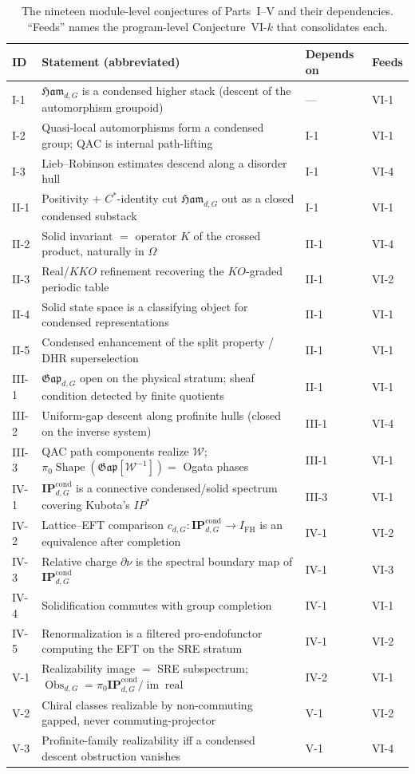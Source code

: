 \documentclass[12pt]{article}
\newcommand{\Shape}{\operatorname{Shape}}      %
\newcommand{\Ham}{\mathfrak{Ham}}              %
\newcommand{\Gap}{\mathfrak{Gap}}              %
\newcommand{\Weq}{\mathcal{W}}                 %
\newcommand{\IPcond}{\mathbf{IP}^{\mathrm{cond}}}  %
\newcommand{\rc}{\partial\nu}                   %
\newcommand{\dis}{\Omega}                       %
\newcommand{\IFH}{I_{\mathrm{FH}}}             %
\newcommand{\real}{\operatorname{real}}        %
\newcommand{\Obs}{\operatorname{Obs}}
\newcommand{\im}{\operatorname{im}}
\theoremstyle{plain}
\theoremstyle{definition}
\theoremstyle{remark}
\begin{document}
\begin{table}[htbp]
\centering
\small
\renewcommand{\arraystretch}{0.95}
\caption{The nineteen module-level conjectures of Parts~I--V and their dependencies.
``Feeds'' names the program-level Conjecture~VI-$k$ that consolidates each.}
\label{tab:conjectures}
\begin{tabular}{@{}l >{\raggedright\arraybackslash}p{7.7cm} l l@{}}
\toprule
ID & Statement (abbreviated) & Depends on & Feeds \\
\midrule
I-1 & $\Ham_{d,G}$ is a condensed higher stack (descent of the automorphism groupoid) & --- & VI-1 \\
I-2 & Quasi-local automorphisms form a condensed group; QAC is internal path-lifting & I-1 & VI-1 \\
I-3 & Lieb--Robinson estimates descend along a disorder hull & I-1 & VI-4 \\
\midrule
II-1 & Positivity $+$ $C^\ast$-identity cut $\Ham_{d,G}$ out as a closed condensed substack & I-1 & VI-1 \\
II-2 & Solid invariant $=$ operator $K$ of the crossed product, naturally in $\dis$ & II-1 & VI-4 \\
II-3 & Real/$KKO$ refinement recovering the $KO$-graded periodic table & II-1 & VI-2 \\
II-4 & Solid state space is a classifying object for condensed representations & II-1 & VI-1 \\
II-5 & Condensed enhancement of the split property / DHR superselection & II-1 & VI-1 \\
\midrule
III-1 & $\Gap_{d,G}$ open on the physical stratum; sheaf condition detected by finite quotients & II-1 & VI-1 \\
III-2 & Uniform-gap descent along profinite hulls (closed on the inverse system) & III-1 & VI-4 \\
III-3 & QAC path components realize $\Weq$; $\pi_0\Shape(\Gap[\Weq^{-1}])=$ Ogata phases & III-1 & VI-1 \\
\midrule
IV-1 & $\IPcond_{d,G}$ is a connective condensed/solid spectrum covering Kubota's $\mathit{IP}^\ast$ & III-3 & VI-1 \\
IV-2 & Lattice--EFT comparison $c_{d,G}:\IPcond_{d,G}\to\IFH$ is an equivalence after completion & IV-1 & VI-2 \\
IV-3 & Relative charge $\rc$ is the spectral boundary map of $\IPcond_{d,G}$ & IV-1 & VI-3 \\
IV-4 & Solidification commutes with group completion & IV-1 & VI-1 \\
IV-5 & Renormalization is a filtered pro-endofunctor computing the EFT on the SRE stratum & IV-1 & VI-2 \\
\midrule
V-1 & Realizability image $=$ SRE subspectrum; $\Obs_{d,G}=\pi_0\IPcond_{d,G}/\im\real$ & IV-2 & VI-1 \\
V-2 & Chiral classes realizable by non-commuting gapped, never commuting-projector & V-1 & VI-2 \\
V-3 & Profinite-family realizability iff a condensed descent obstruction vanishes & V-1 & VI-4 \\
\bottomrule
\end{tabular}
\end{table}
\end{document}
